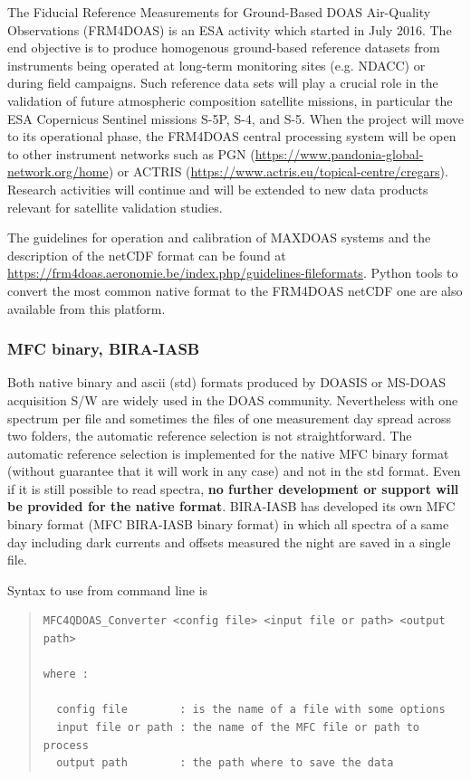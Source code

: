 The Fiducial Reference Measurements for Ground-Based DOAS Air-Quality Observations (FRM4DOAS) is an ESA activity which started in July 2016.  The end objective is to produce homogenous ground-based 
reference datasets from instruments being operated at long-term monitoring sites (e.g. NDACC) or during field campaigns.
Such reference data sets will play a crucial role in the validation of future atmospheric composition satellite missions, in particular the ESA Copernicus Sentinel missions S-5P, S-4, and S-5.  
When the project will move to its operational phase, the FRM4DOAS central processing system will be open to other instrument networks such as PGN (\url{https://www.pandonia-global-network.org/home}) or 
ACTRIS (\url{https://www.actris.eu/topical-centre/cregars}).  Research activities will continue and will be extended to new data products relevant for satellite validation studies.

The guidelines for operation and calibration of MAXDOAS systems and the description of the netCDF format can be found at \url{https://frm4doas.aeronomie.be/index.php/guidelines-fileformats}.  
Python tools to convert the most common native format to the FRM4DOAS netCDF one are also available from this platform.

\subsubsection{MFC binary, BIRA-IASB} \label{sec:MFC_bin}

Both native binary and ascii (std) formats produced by DOASIS or MS-DOAS acquisition S/W are widely used in the DOAS community.  Nevertheless with one spectrum per file and sometimes the files of one measurement day spread across two folders, the automatic reference selection is not straightforward.
The automatic reference selection is implemented for the native MFC binary format (without guarantee that it will work in any case) and not in the std format.  Even if it is still possible to read spectra, \textbf{no further development or support will be provided for the native format}.  BIRA-IASB has developed its own MFC binary format (MFC BIRA-IASB binary format) in which all spectra of a same day including dark currents and offsets measured the night are saved in a single file.

Syntax to use from command line is

\begin{quote}
\begin{Verbatim}[fontfamily=courier,fontsize=\relsize{-4}]
MFC4QDOAS_Converter <config file> <input file or path> <output path>

where :

  config file        : is the name of a file with some options
  input file or path : the name of the MFC file or path to process
  output path        : the path where to save the data
\end{Verbatim}
\end{quote}

